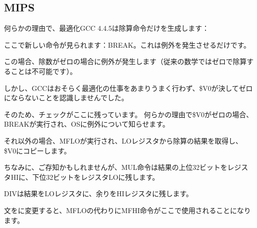﻿\subsection{MIPS}

何らかの理由で、最適化GCC 4.4.5は除算命令だけを生成します：



ここで新しい命令が見られます：BREAK。これは例外を発生させるだけです。

この場合、除数がゼロの場合に例外が発生します（従来の数学ではゼロで除算することは不可能です）。

しかし、GCCはおそらく最適化の仕事をあまりうまく行わず、\$V0が決してゼロにならないことを認識しませんでした。

そのため、チェックがここに残っています。
何らかの理由で\$V0がゼロの場合、BREAKが実行され、\ac{OS}に例外について知らせます。

それ以外の場合、MFLOが実行され、LOレジスタから除算の結果を取得し、\$V0にコピーします。

ちなみに、ご存知かもしれませんが、MUL命令は結果の上位32ビットをレジスタHIに、下位32ビットをレジスタLOに残します。

DIVは結果をLOレジスタに、余りをHIレジスタに残します。

文をに変更すると、MFLOの代わりにMFHI命令がここで使用されることになります。